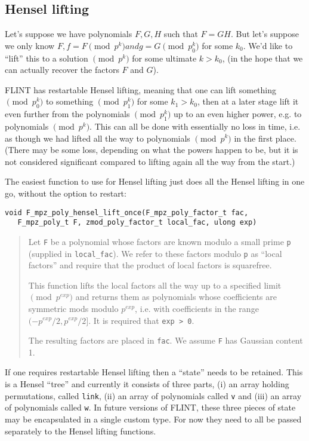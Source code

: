 \documentclass[a4paper,10pt]{article}
\newcommand{\code}{\lstinline}
\begin{document}
\subsection{Hensel lifting}

Let's suppose we have polynomials $F, G, H$ such that $F = GH$. But let's suppose we only know
$F, f = F \pmod{p^k} and g = G \pmod{p^k_0}$ for some $k_0$. We'd like to ``lift'' this to a solution
$\pmod{p^k}$ for some ultimate $k > k_0$, (in the hope that we can actually recover the factors $F$ 
and $G$).

FLINT has restartable Hensel lifting, meaning that one can lift something $\pmod{p^k_0}$ to something
$\pmod{p^k_1}$ for some $k_1 > k_0$, then at a later stage lift it even further from the polynomials
$\pmod{p^k_1}$ up to an even higher power, e.g. to polynomials $\pmod{p^k}$. This can all be done with
essentially no loss in time, i.e. as though we had lifted all the way to polynomials $\pmod{p^k}$ in 
the first place. (There may be some loss, depending on what the powers happen to be, but it is not 
considered significant compared to lifting again all the way from the start.)

The easiest function to use for Hensel lifting just does all the Hensel lifting in one go, without the
option to restart:

\begin{lstlisting}
void F_mpz_poly_hensel_lift_once(F_mpz_poly_factor_t fac, 
   F_mpz_poly_t F, zmod_poly_factor_t local_fac, ulong exp)
\end{lstlisting}
\begin{quote}
Let \code{F} be a polynomial whose factors are known modulo a small prime \code{p} (supplied in 
\code{local_fac}). We refer to these factors modulo \code{p} as ``local factors'' and require that the 
product of local factors is squarefree. 

This function lifts the local factors all the way up to a specified limit $\pmod{p^{exp}}$ and returns
them as polynomials whose coefficients are symmetric mods modulo $p^{exp}$, i.e. with coefficients in 
the range $(-p^{exp}/2, p^{exp}/2]$. It is required that \code{exp > 0}.

The resulting factors are placed in \code{fac}. We assume \code{F} has Gaussian content 1. 
\end{quote}

If one requires restartable Hensel lifting then a ``state'' needs to be retained. This is a Hensel 
``tree'' and currently it consists of three parts, (i) an array holding permutations, called \code{link},
(ii) an array of polynomials called \code{v} and (iii) an array of polynomials called \code{w}. In 
future versions of FLINT, these three pieces of state may be encapsulated in a single custom type. For
now they need to all be passed separately to the Hensel lifting functions.
\end{document}
